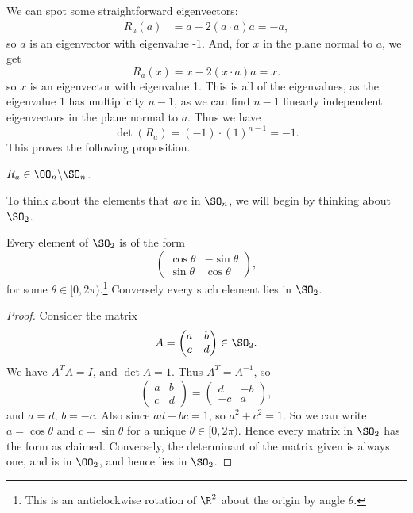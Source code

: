 \documentclass[a4paper]{scrartcl}
\begin{document}
We can spot some straightforward eigenvectors:
\begin{align*}
R_a(a) &= a - 2(a \cdot a)a = -a,
\end{align*}
so $a$ is an eigenvector with eigenvalue -1. And, for $x$ in the plane normal to $a$, we get
$$
R_a(x) = x - 2(x \cdot a) a = x.
$$
so $x$ is an eigenvector with eigenvalue 1. This is all of the eigenvalues, as the eigenvalue 1 has multiplicity $n - 1$, as we can find $n - 1$ linearly independent eigenvectors in the plane normal to $a$. Thus we have
$$
\det(R_a) = (-1) \cdot (1)^{n - 1} = -1.
$$
This proves the following proposition.
\begin{proposition}
	$R_a \in \OO_n \backslash \SO_n$.
\end{proposition}

To think about the elements that \emph{are} in $\SO_n$, we will begin by thinking about $\SO_2$.

\begin{theorem}[Elements of $\SO_2$]
	Every element of $\SO_2$ is of the form
	$$
	\begin{pmatrix}
		\cos \theta & - \sin \theta \\
		\sin \theta & \cos \theta
	\end{pmatrix},
	$$
	for some $\theta \in [0, 2 \pi)$.\footnote{This is an anticlockwise rotation of $\R^2$ about the origin by angle $\theta$.} Conversely every such element lies in $\SO_2$.
\end{theorem}
\begin{proof}
	Consider the matrix
	$$
A = \begin{pmatrix}
	a & b \\ c & d
\end{pmatrix} \in \SO_2.
	$$
	We have $A^T A = I$, and $\det A = 1$. Thus $A^T = A^{-1}$, so
	$$
	\begin{pmatrix}
		a & b \\ c & d
	\end{pmatrix} = \begin{pmatrix}
		d & -b \\ -c & a
	\end{pmatrix},
	$$
	and $a = d$, $b = -c$. Also since $ad - bc = 1$, so $a^2 + c^2 = 1$. So we can write $a = \cos \theta$ and $c = \sin \theta$ for a unique $\theta \in [0, 2\pi)$. Hence every matrix in $\SO_2$ has the form as claimed. Conversely, the determinant of the matrix given is always one, and is in $\OO_2$, and hence lies in $\SO_2$.
\end{proof}
\end{document}
